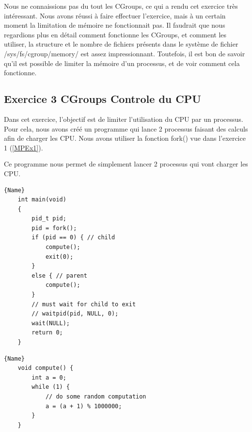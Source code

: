 \documentclass[
	a4paper, %
	10pt, %
]{CSUniSchoolLabReport}
\begin{document}

Nous ne connaissions pas du tout les CGroups, ce qui a rendu cet exercice tr\`es int\'eressant.
Nous avons réussi \`a faire effectuer l'exercice, mais \`a un certain moment la limitation de m\'emoire ne fonctionnait pas.
Il faudrait que nous regardions plus en d\'etail comment fonctionne les CGroups, et comment les utiliser, la structure et le nombre de fichiers pr\'esents dans le syst\`eme de fichier /sys/fs/cgroup/memory/ est assez impressionnant.
Toutefois, il est bon de savoir qu'il est possible de limiter la m\'emoire d'un processus, et de voir comment cela fonctionne.

\subsection{Exercice 3 CGroups Controle du CPU}\label{MPEx3}
Dans cet exercice, l'objectif est de limiter l'utilisation du CPU par un processus.
Pour cela, nous avons cré\'e un programme qui lance 2 processus faisant des calculs afin de charger les CPU. 
Nous avons utiliser la fonction fork() vue dans l'exercice 1 (\ref{MPEx1}).

Ce programme nous permet de simplement lancer 2 processus qui vont charger les CPU.\\
\noindent\begin{minipage}{.50\textwidth}
	\begin{lstlisting}[style=CStyle, caption=Processus Enfant, firstnumber=1]{Name}
	int main(void)
	{
		pid_t pid;
		pid = fork();
		if (pid == 0) { // child
			compute();
			exit(0);
		}
		else { // parent
			compute();
		}
		// must wait for child to exit
		// waitpid(pid, NULL, 0);
		wait(NULL);
		return 0;
	}
	\end{lstlisting}
	\end{minipage}\hfill
	\begin{minipage}{.45\textwidth}
	\begin{lstlisting}[style=CStyle, caption=Processus Parent, firstnumber=1]{Name}
	void compute() {
		int a = 0;
		while (1) {
			// do some random computation
			a = (a + 1) % 1000000;
		}
	}
	\end{lstlisting}
\end{minipage}
\end{document}
